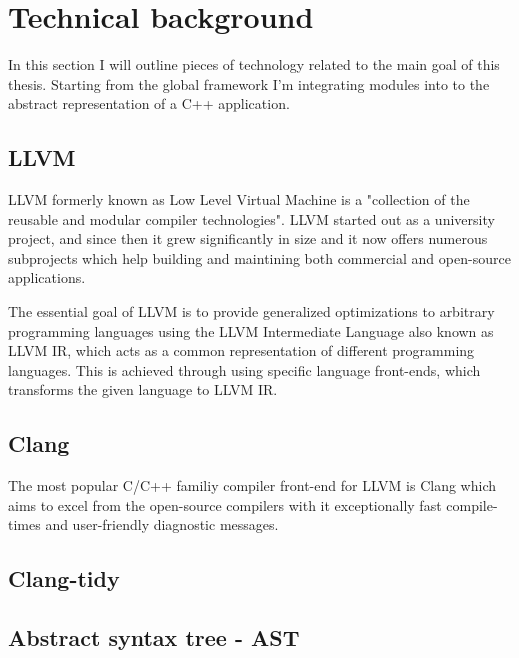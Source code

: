 \section{Technical background}
\par In this section I will outline pieces of technology related to the main goal of this thesis. Starting from the global framework I'm integrating modules into to the abstract representation of a C++ application.
\subsection{LLVM}
\par LLVM formerly known as Low Level Virtual Machine is a "collection of the reusable and modular compiler technologies"\cite{llvm_mainpage}. LLVM started out as a university project\cite{LLVM:CGO04}, and since then it grew significantly in size and it now offers numerous subprojects which help building and maintining both commercial and open-source applications.
\par The essential goal of LLVM is to provide generalized optimizations to arbitrary programming languages using the LLVM Intermediate Language also known as LLVM IR, which acts as a common representation of different programming languages. This is achieved through using specific language front-ends, which transforms the given language to LLVM IR. 
\subsection{Clang}
\par The most popular C/C++ familiy compiler front-end for LLVM is Clang which aims to excel from the open-source compilers with it exceptionally fast compile-times and user-friendly diagnostic messages. 
\subsection{Clang-tidy}
\subsection{Abstract syntax tree - AST}